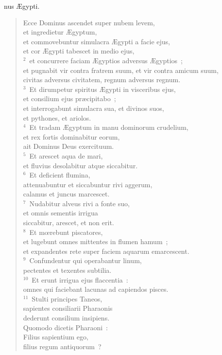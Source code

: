 \bchapter
{}nus \AE gypti. \begin{verse}Ecce Dominus ascendet super nubem levem,\\ et ingredietur \AE gyptum,\\ et commovebuntur simulacra \AE gypti a facie ejus,\\ et cor \AE gypti tabescet in medio ejus,\\
${}^{2}$~et concurrere faciam \AE gyptios adversus \AE gyptios~;\\ et pugnabit vir contra fratrem suum, et vir contra amicum suum,\\ civitas adversus civitatem, regnum adversus regnum.\\
${}^{3}$~Et dirumpetur spiritus \AE gypti in visceribus ejus,\\ et consilium ejus pr\ae cipitabo~;\\ et interrogabunt simulacra sua, et divinos suos,\\ et pythones, et ariolos.\\
${}^{4}$~Et tradam \AE gyptum in manu dominorum crudelium,\\ et rex fortis dominabitur eorum,\\ ait Dominus Deus exercituum.\\
${}^{5}$~Et arescet aqua de mari,\\ et fluvius desolabitur atque siccabitur.\\
${}^{6}$~Et deficient flumina,\\ attenuabuntur et siccabuntur rivi aggerum,\\ calamus et juncus marcescet.\\
${}^{7}$~Nudabitur alveus rivi a fonte suo,\\ et omnis sementis irrigua\\ siccabitur, arescet, et non erit.\\
${}^{8}$~Et mœrebunt piscatores,\\ et lugebunt omnes mittentes in flumen hamum~;\\ et expandentes rete super faciem aquarum emarcescent.\\
${}^{9}$~Confundentur qui operabantur linum,\\ pectentes et texentes subtilia.\\
${}^{10}$~Et erunt irrigua ejus flaccentia~:\\ omnes qui faciebant lacunas ad capiendos pisces.\\
${}^{11}$~Stulti principes Taneos,\\ sapientes consiliarii Pharaonis\\ dederunt consilium insipiens.\\ Quomodo dicetis Pharaoni~:\\ Filius sapientium ego,\\ filius regum antiquorum~?\\

\end{verse}

